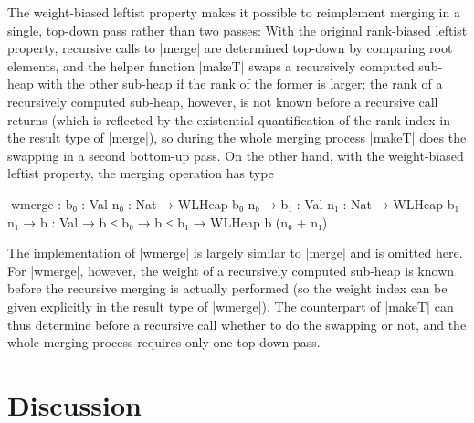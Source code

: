 The weight-biased leftist property makes it possible to reimplement merging in a single, top-down pass rather than two passes:
With the original rank-biased leftist property, recursive calls to |merge| are determined top-down by comparing root elements, and the helper function |makeT| swaps a recursively computed sub-heap with the other sub-heap if the rank of the former is larger; the rank of a recursively computed sub-heap, however, is not known before a recursive call returns (which is reflected by the existential quantification of the rank index in the result type of |merge|), so during the whole merging process |makeT| does the swapping in a second bottom-up pass.
On the other hand, with the weight-biased leftist property, the merging operation has type
\begin{code}
^^^wmerge :  {b₀  : Val} {n₀  : Nat} → WLHeap  b₀  n₀  →
             {b₁  : Val} {n₁  : Nat} → WLHeap  b₁  n₁  →
             {b   : Val} → b ≤ b₀ → b ≤ b₁ → WLHeap b (n₀ + n₁)
\end{code}
The implementation of |wmerge| is largely similar to |merge| and is omitted here.
For |wmerge|, however, the weight of a recursively computed sub-heap is known before the recursive merging is actually performed (so the weight index can be given explicitly in the result type of |wmerge|).
The counterpart of |makeT| can thus determine before a recursive call whether to do the swapping or not, and the whole merging process requires only one top-down pass.


\section{Discussion}
\label{sec:ornament-refinement-discussion}

